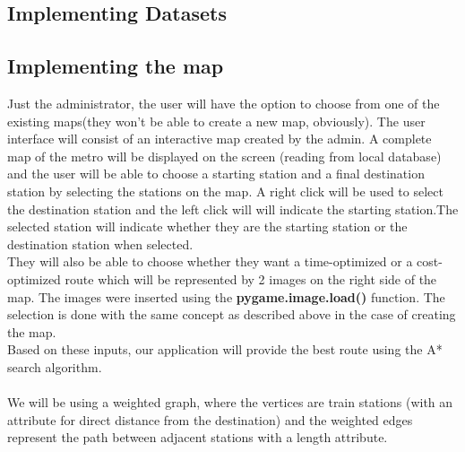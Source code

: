 \documentclass[fontsize=11pt]{article}
\begin{document}
    \subsection*{Implementing Datasets}

    \subsection*{Implementing the map}
    Just the administrator, the user will have the option to choose from one of the existing maps(they won't be able to create a new map, obviously). The user interface will consist of an interactive map created by the admin. A complete map of the metro will be displayed on the screen (reading from local database) and the user will be able to choose a starting station and a final destination station by selecting the stations on the map. A right click will be used to select the destination station and the left click will will indicate the starting station.The selected station will indicate whether they are the starting station or the destination station when selected.\\
    They will also be able to choose whether they want a time-optimized or a cost-optimized route which will be represented by 2 images on the right side of the map. The images were inserted using the \textbf{pygame.image.load()} function. The selection is done with the same concept as described above in the case of creating the map.\\
    Based on these inputs, our application will provide the best route using the A* search algorithm.\\
    \\
    We will be using a weighted graph, where the vertices are train stations (with an attribute for direct distance from the destination) and the weighted edges represent the path between adjacent stations with a length attribute. \\
    \\
\end{document}
